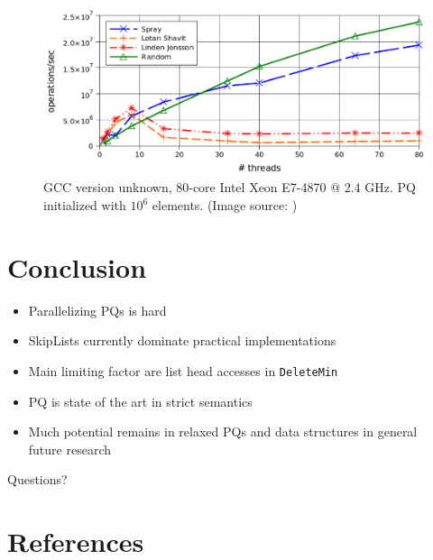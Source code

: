 \documentclass[usenames,dvipsnames]{beamer}
\begin{document}
\begin{frame}{}
\framesubtitle{\citeauthor{alistarhspraylist}}
\begin{figure}
\includegraphics[width=\textwidth]{results_spraylist}
\caption{GCC version unknown, 80-core Intel Xeon E7-4870 @ 2.4 GHz. \ac{PQ} initialized with $10^6$
elements.
(Image source: \cite{alistarhspraylist})}
\end{figure}
\end{frame}

\section{Conclusion} \label{sec:conclusion}

\begin{frame}{}
\begin{itemize}
\item Parallelizing \acp{PQ} is hard
\item SkipLists currently dominate practical implementations
\item Main limiting factor are list head accesses in \lstinline|DeleteMin|
\item \citeauthor{linden2013skiplist} \ac{PQ} is state of the art in strict
      semantics
\item Much potential remains in relaxed \acp{PQ} and data structures in general
      \textrightarrow ~ future research
\end{itemize}
\end{frame}

\begin{frame}{}
\centering
Questions?
\end{frame}

\section{References} \label{sec:references}

\begin{frame}[allowframebreaks]{}
\printbibliography
\end{frame}
\end{document}
